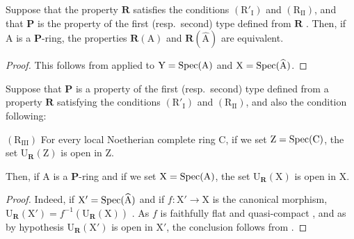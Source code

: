 \begin{proposition}[7.3.17]
\label{IV.7.3.17}
Suppose that the property $\boldsymbol{R}$ satisfies the conditions $(\mathrm{R}'_\mathrm{I})$ and $(\mathrm{R_{II}})$, and that $\boldsymbol{P}$ is the property of the first (resp.~second) type defined from $\boldsymbol{R}$ .
Then, if $\mathrm{A}$ is a $\boldsymbol{P}$-ring, the properties $\boldsymbol{R}(\mathrm{A})$ and $\boldsymbol{R}(\widehat{\mathrm{A}})$ are equivalent.
\end{proposition}

\begin{proof}
This follows from  applied to $\mathrm{Y}=\operatorname{Spec}(\mathrm{A})$ and $\mathrm{X}=\operatorname{Spec}(\widehat{\mathrm{A}})$.
\end{proof}

\begin{proposition}[7.3.18]
\label{IV.7.3.18}
Suppose that $\boldsymbol{P}$ is a property of the first (resp.~second) type defined from a property $\boldsymbol{R}$ satisfying the conditions $(\mathrm{R}'_\mathrm{I})$ and $(\mathrm{R_{II}})$, and also the condition following:

$(\mathrm{R_{III}})$ For every local Noetherian complete ring $\mathrm{C}$, if we set $\mathrm{Z}=\operatorname{Spec}(\mathrm{C})$, the set $\mathrm{U}_{\boldsymbol{R}}(\mathrm{Z})$  is open in $\mathrm{Z}$.

Then, if $\mathrm{A}$ is a $\boldsymbol{P}$-ring and if we set $\mathrm{X}=\operatorname{Spec}(\mathrm{A})$, the set $\mathrm{U}_{\boldsymbol{R}}(\mathrm{X})$ is open in $\mathrm{X}$.
\end{proposition}

\begin{proof}
Indeed, if $\mathrm{X}'=\operatorname{Spec}(\widehat{\mathrm{A}})$ and if $f:\mathrm{X}'\to\mathrm{X}$ is the canonical morphism, $\mathrm{U}_{\boldsymbol{R}}(\mathrm{X}')=f^{-1}(\mathrm{U}_{\boldsymbol{R}}(\mathrm{X}))$ .
As $f$ is faithfully flat and quasi-compact , and as by hypothesis $\mathrm{U}_{\boldsymbol{R}}(\mathrm{X}')$ is open in $\mathrm{X}'$, the conclusion follows from .
\end{proof}

